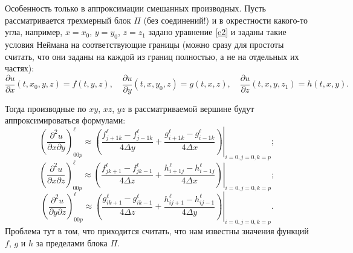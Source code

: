 \documentclass[a4paper]{article}
\begin{document}
Особенность только в аппроксимации смешанных производных. Пусть рас\-сма\-три\-ва\-ет\-ся трехмерный блок $\Pi$ (без соединений!) и в окрестности какого-то угла, например, $x = x_0$, $y = y_0$, $z = z_1$ задано уравнение \eqref{e2} и заданы такие условия Неймана на соответствующие границы (можно сразу для простоты считать, что они заданы на каждой из границ полностью, а не на отдельных их частях):
\begin{equation*}
\frac{\partial u}{\partial x}(t,x_0,y,z) = f(t,y,z), \quad \frac{\partial u}{\partial y}(t,x,y_0,z) = g(t,x,z), \quad \frac{\partial u}{\partial z}(t,x,y,z_1) = h(t,x,y).
\end{equation*}

Тогда производные по $xy$, $xz$, $yz$ в рассматриваемой вершине будут ап\-про\-кси\-ми\-ро\-вать\-ся формулами:
\begin{equation*}
\left(\frac{\partial^2 u}{\partial x\partial y}\right)^{\ell}_{00p} \approx \left.\left(\frac{f^{\ell}_{j+1k} - f^{\ell}_{j-1k}}{4\Delta y} + \frac{g^{\ell}_{i+1k} - g^{\ell}_{i-1k}}{4\Delta x}\right)\right|_{i = 0, j = 0, k = p};
\end{equation*}
\begin{equation*}
\left(\frac{\partial^2 u}{\partial x\partial z}\right)^{\ell}_{00p} \approx \left.\left(\frac{f^{\ell}_{jk+1} - f^{\ell}_{jk-1}}{4\Delta z} + \frac{h^{\ell}_{i+1j} - h^{\ell}_{i-1j}}{4\Delta x}\right)\right|_{i = 0, j = 0, k = p};
\end{equation*}
\begin{equation*}
\left(\frac{\partial^2 u}{\partial y\partial z}\right)^{\ell}_{00p} \approx \left.\left(\frac{g^{\ell}_{ik+1} - g^{\ell}_{ik-1}}{4\Delta z} + \frac{h^{\ell}_{ij+1} - h^{\ell}_{ij-1}}{4\Delta y}\right)\right|_{i = 0, j = 0, k = p}.
\end{equation*}
Проблема тут в том, что приходится считать, что нам известны значения функций $f$, $g$ и $h$ за пределами блока $\Pi$.
\end{document}
